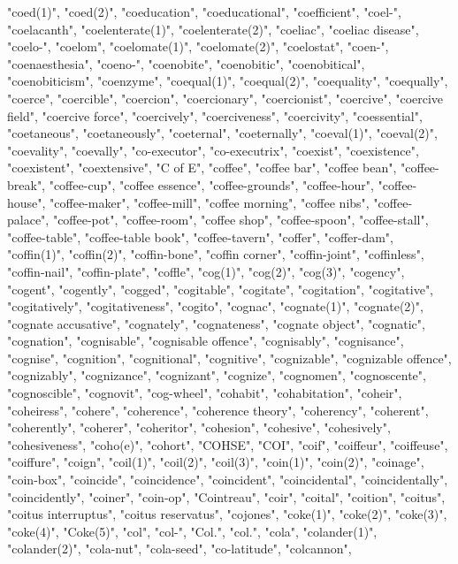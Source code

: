"coed(1)",
"coed(2)",
"coeducation",
"coeducational",
"coefficient",
"coel-",
"coelacanth",
"coelenterate(1)",
"coelenterate(2)",
"coeliac",
"coeliac disease",
"coelo-",
"coelom",
"coelomate(1)",
"coelomate(2)",
"coelostat",
"coen-",
"coenaesthesia",
"coeno-",
"coenobite",
"coenobitic",
"coenobitical",
"coenobiticism",
"coenzyme",
"coequal(1)",
"coequal(2)",
"coequality",
"coequally",
"coerce",
"coercible",
"coercion",
"coercionary",
"coercionist",
"coercive",
"coercive field",
"coercive force",
"coercively",
"coerciveness",
"coercivity",
"coessential",
"coetaneous",
"coetaneously",
"coeternal",
"coeternally",
"coeval(1)",
"coeval(2)",
"coevality",
"coevally",
"co-executor",
"co-executrix",
"coexist",
"coexistence",
"coexistent",
"coextensive",
"C of E",
"coffee",
"coffee bar",
"coffee bean",
"coffee-break",
"coffee-cup",
"coffee essence",
"coffee-grounds",
"coffee-hour",
"coffee-house",
"coffee-maker",
"coffee-mill",
"coffee morning",
"coffee nibs",
"coffee-palace",
"coffee-pot",
"coffee-room",
"coffee shop",
"coffee-spoon",
"coffee-stall",
"coffee-table",
"coffee-table book",
"coffee-tavern",
"coffer",
"coffer-dam",
"coffin(1)",
"coffin(2)",
"coffin-bone",
"coffin corner",
"coffin-joint",
"coffinless",
"coffin-nail",
"coffin-plate",
"coffle",
"cog(1)",
"cog(2)",
"cog(3)",
"cogency",
"cogent",
"cogently",
"cogged",
"cogitable",
"cogitate",
"cogitation",
"cogitative",
"cogitatively",
"cogitativeness",
"cogito",
"cognac",
"cognate(1)",
"cognate(2)",
"cognate accusative",
"cognately",
"cognateness",
"cognate object",
"cognatic",
"cognation",
"cognisable",
"cognisable offence",
"cognisably",
"cognisance",
"cognise",
"cognition",
"cognitional",
"cognitive",
"cognizable",
"cognizable offence",
"cognizably",
"cognizance",
"cognizant",
"cognize",
"cognomen",
"cognoscente",
"cognoscible",
"cognovit",
"cog-wheel",
"cohabit",
"cohabitation",
"coheir",
"coheiress",
"cohere",
"coherence",
"coherence theory",
"coherency",
"coherent",
"coherently",
"coherer",
"coheritor",
"cohesion",
"cohesive",
"cohesively",
"cohesiveness",
"coho(e)",
"cohort",
"COHSE",
"COI",
"coif",
"coiffeur",
"coiffeuse",
"coiffure",
"coign",
"coil(1)",
"coil(2)",
"coil(3)",
"coin(1)",
"coin(2)",
"coinage",
"coin-box",
"coincide",
"coincidence",
"coincident",
"coincidental",
"coincidentally",
"coincidently",
"coiner",
"coin-op",
"Cointreau",
"coir",
"coital",
"coition",
"coitus",
"coitus interruptus",
"coitus reservatus",
"cojones",
"coke(1)",
"coke(2)",
"coke(3)",
"coke(4)",
"Coke(5)",
"col",
"col-",
"Col.",
"col.",
"cola",
"colander(1)",
"colander(2)",
"cola-nut",
"cola-seed",
"co-latitude",
"colcannon",
